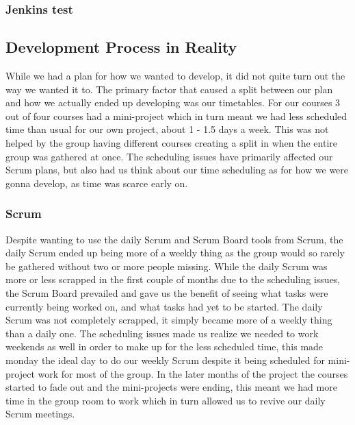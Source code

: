 \subsubsection{Jenkins test}
\subsection{Development Process in Reality}
While we had a plan for how we wanted to develop, it did not quite turn out the way we wanted it to.
The primary factor that caused a split between our plan and how we actually ended up developing was our timetables.
For our courses 3 out of four courses had a mini-project which in turn meant we had less scheduled time than usual for our own project, about 1 - 1.5 days a week.
This was not helped by the group having different courses creating a split in when the entire group was gathered at once.
The scheduling issues have primarily affected our Scrum plans, but also had us think about our time scheduling as for how we were gonna develop, as time was scarce early on.
\subsubsection{Scrum}
Despite wanting to use the daily Scrum and Scrum Board tools from Scrum, the daily Scrum ended up being more of a weekly thing as the group would so rarely be gathered without two or more people missing.
While the daily Scrum was more or less scrapped in the first couple of months due to the scheduling issues, the Scrum Board prevailed and gave us the benefit of seeing what tasks were currently being worked on, and what tasks had yet to be started.
The daily Scrum was not completely scrapped, it simply became more of a weekly thing than a daily one.
The scheduling issues made us realize we needed to work weekends as well in order to make up for the less scheduled time, this made monday the ideal day to do our weekly Scrum despite it being scheduled for mini-project work for most of the group.
In the later months of the project the courses started to fade out and the mini-projects were ending, this meant we had more time in the group room to work which in turn allowed us to revive our daily Scrum meetings.
